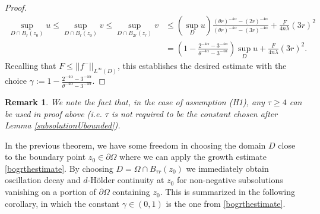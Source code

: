 \documentclass[12pt]{amsart}
\newtheorem{Remark}[Theorem]{Remark}
\def \O {\Omega}
\def \a {\alpha}
\def \t {\tau}
\begin{document}
\begin{proof}
\begin{align*}
\sup_{D \cap B_r(z_0)} u\leq \sup_{D \cap B_r(z_0)} v\leq \sup_{D \cap B_{2r}(z_r)} v &\leq \left(\sup_D u \right) \frac{(\theta r)^{-4\a}-(2 r)^{-4\a}}{(\theta r)^{-4\a}-(3 r)^{-4\a}}+\frac{F}{4n\lambda}(3r)^2\\
&=\left(1-\frac{2^{-4\a}-3^{-4\a}}{\theta^{-4\a}-3^{-4\a}}\right) \sup_D u+\frac{F}{4n\lambda}(3r)^2.
\end{align*}
Recalling that $F\leq ||f^-||_{L^{\infty}(D)}$, this establishes the desired estimate with the choice $\gamma:= 1-\frac{2^{-4\a}-3^{-4\a}}{\theta^{-4\a}-3^{-4\a}}$.  
\end{proof}

\begin{Remark}
We note the fact that, in the case of assumption {\rm{(H1)}}, any $\t\geq 4$ can be used in proof above (i.e. $\t$ is not required to be the constant chosen after Lemma \ref{subsolutionUbounded}). 
\end{Remark}

In the previous theorem, we have some freedom in choosing the domain $D$ close to the boundary point $z_0\in\partial\O$ where we can apply the growth estimate \eqref{bogrthestimate}. By choosing $D=\O\cap B_{\t r}(z_0)$ we immediately obtain oscillation decay and $d$-H\"older continuity at $z_0$ for non-negative subsolutions vanishing on a portion of $\partial\O$ containing $z_0$. This is summarized in the following corollary, in which the constant $\gamma\in(0,1)$ is the one from \eqref{bogrthestimate}. 
\end{document}
